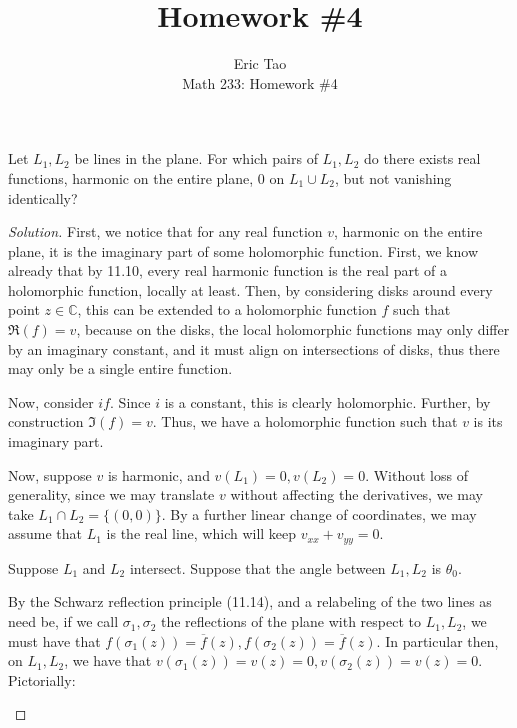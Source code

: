 \documentclass[10pt]{article}
\newenvironment{problem}[2][]{\begin{trivlist}
\item[\hskip \labelsep {\bfseries #1}\hskip \labelsep {\bfseries #2.}]}{\end{trivlist}}
\begin{document}
 
\title{Homework \#4}
\author{Eric Tao\\
Math 233: Homework \#4}
\maketitle

\begin{problem}{Question 1}

Let $L_1, L_2$ be lines in the plane. For which pairs of $L_1, L_2$ do there exists real functions, harmonic on the entire plane, 0 on $L_1 \cup L_2$, but not vanishing identically?

\end{problem}
\begin{proof}[Solution]

First, we notice that for any real function $v$, harmonic on the entire plane, it is the imaginary part of some holomorphic function. First, we know already that by 11.10, every real harmonic function is the real part of a holomorphic function, locally at least. Then, by considering disks around every point $z \in \mathbb{C}$, this can be extended to a holomorphic function $f$ such that $\Re(f) = v$, because on the disks, the local holomorphic functions may only differ by an imaginary constant, and it must align on intersections of disks, thus there may only be a single entire function.

Now, consider $i f$. Since $i$ is a constant, this is clearly holomorphic. Further, by construction $\Im(f) = v$. Thus, we have a holomorphic function such that $v$ is its imaginary part.

Now, suppose $v$ is harmonic, and $v(L_1) = 0, v(L_2) = 0$. Without loss of generality, since we may translate $v$ without affecting the derivatives, we may take $L_1 \cap L_2 = \{ (0,0)\}$. By a further linear change of coordinates, we may assume that $L_1$ is the real line, which will keep $v_{xx} + v_{yy} = 0$. 

Suppose $L_1$ and $L_2$ intersect.  Suppose that the angle between $L_1, L_2$ is $\theta_0$.

By the Schwarz reflection principle (11.14), and a relabeling of the two lines as need be, if we call $\sigma_1, \sigma_2$ the reflections of the plane with respect to $L_1, L_2$, we must have that $f(\sigma_1(z)) = \overline{f}(z), f(\sigma_2(z)) = \overline{f}(z)$. In particular then, on $L_1, L_2$, we have that $v(\sigma_1(z)) = v(z) = 0, v(\sigma_2(z)) = v(z) = 0$. Pictorially:

\begin{figure}[H]
\centering
{}
\end{figure}


\end{proof}
\end{document}
